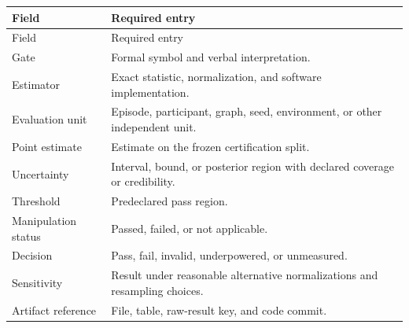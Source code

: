 \begin{longtable}{@{}>{\raggedright\arraybackslash}p{}>{\raggedright\arraybackslash}p{}@{}}
\toprule
Field & Required entry \\
\midrule
\endfirsthead
\toprule
Field & Required entry \\
\midrule
\endhead
Gate & Formal symbol and verbal interpretation. \\
Estimator & Exact statistic, normalization, and software implementation. \\
Evaluation unit & Episode, participant, graph, seed, environment, or other
independent unit. \\
Point estimate & Estimate on the frozen certification split. \\
Uncertainty & Interval, bound, or posterior region with declared coverage or
credibility. \\
Threshold & Predeclared pass region. \\
Manipulation status & Passed, failed, or not applicable. \\
Decision & Pass, fail, invalid, underpowered, or unmeasured. \\
Sensitivity & Result under reasonable alternative normalizations and
resampling choices. \\
Artifact reference & File, table, raw-result key, and code commit. \\
\bottomrule
\end{longtable}


